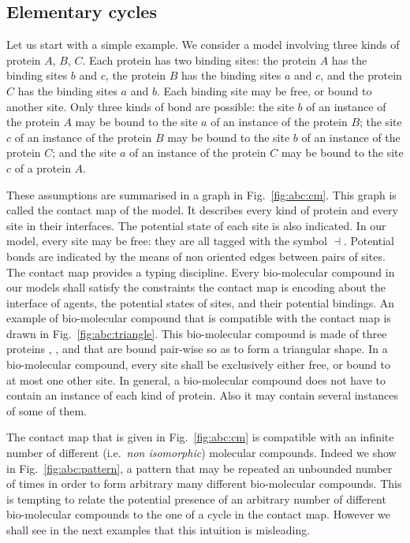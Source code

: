 \documentclass{entcs}
\newcommand{\freesymbol}{\dashv}
\begin{document}
\subsection{Elementary cycles}

\label{sec:triangle}

Let us start with a simple example. We consider a model involving three kinds of protein $A$, $B$, $C$. Each protein has two binding sites: the protein $A$ has the binding sites $b$ and $c$, the protein $B$ has the binding sites $a$ and $c$, and the protein $C$ has the binding sites $a$ and $b$. Each binding site may be free, or bound to another site. Only three kinds of bond are possible: the site $b$ of an instance of the protein $A$ may be bound to the site $a$ of an instance of the protein $B$; the site $c$ of an instance of the  protein $B$ may be bound to the site $b$ of an instance of the protein $C$; and the site $a$ of an instance of the protein $C$ may be bound to the site $c$ of a protein $A$.

These assumptions are summarised in a graph in Fig.~\ref{fig:abc:cm}. This graph is called the contact map of the model. It describes every kind of protein and every site in their interfaces. The potential state of each site is also indicated. In our model, every site may be free: they are all tagged with the symbol $\freesymbol$. Potential bonds are indicated by the means of non oriented edges between pairs of sites.  The contact map provides a typing discipline.
Every bio-molecular compound in our models shall satisfy the constraints the contact map is encoding about the interface of agents, the potential states of sites, and their potential bindings. An example of bio-molecular compound that is compatible with the contact map is drawn in Fig.~\ref{fig:abc:triangle}. This bio-molecular compound is made of three proteins , , and  that are bound pair-wise so as to form a triangular shape.
In a bio-molecular compound, every site shall be exclusively either free, or bound to at most one other site. In general, a bio-molecular compound does not have to contain an instance of each kind of protein. Also it may contain several instances of some of them.

The contact map that is given in Fig.~\ref{fig:abc:cm} is compatible with an infinite number of different (i.e.~\emph{non isomorphic}) molecular compounds.
Indeed we show in Fig.~\ref{fig:abc:pattern}, a pattern
that may be repeated an unbounded number of times in order to form arbitrary many different bio-molecular compounds. This is tempting to relate the potential presence of an arbitrary number of different bio-molecular compounds to the one of a cycle in the contact map. However we shall see in the next examples that this intuition is misleading.
\end{document}
